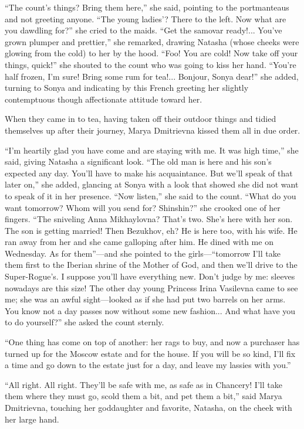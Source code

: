 ``The count's things? Bring them here,'' she said, pointing to
the portmanteaus and not greeting anyone. ``The young ladies'?
There to the left. Now what are you dawdling for?'' she cried to
the maids. ``Get the samovar ready!... You've grown plumper and
prettier,'' she remarked, drawing Natasha (whose cheeks were
glowing from the cold) to her by the hood. ``Foo! You are cold!
Now take off your things, quick!'' she shouted to the count who
was going to kiss her hand. ``You're half frozen, I'm sure! Bring
some rum for tea!... Bonjour, Sonya dear!'' she added, turning to
Sonya and indicating by this French greeting her slightly
contemptuous though affectionate attitude toward her.

When they came in to tea, having taken off their outdoor things
and tidied themselves up after their journey, Marya Dmitrievna
kissed them all in due order.

``I'm heartily glad you have come and are staying with me. It was
high time,'' she said, giving Natasha a significant look. ``The
old man is here and his son's expected any day. You'll have to
make his acquaintance.  But we'll speak of that later on,'' she
added, glancing at Sonya with a look that showed she did not want
to speak of it in her presence. ``Now listen,'' she said to the
count. ``What do you want tomorrow? Whom will you send for?
Shinshin?'' she crooked one of her fingers. ``The sniveling Anna
Mikhaylovna? That's two. She's here with her son. The son is
getting married! Then Bezukhov, eh? He is here too, with his
wife. He ran away from her and she came galloping after him. He
dined with me on Wednesday. As for them''---and she pointed to
the girls---``tomorrow I'll take them first to the Iberian shrine
of the Mother of God, and then we'll drive to the
Super-Rogue's. I suppose you'll have everything new.  Don't judge
by me: sleeves nowadays are this size! The other day young
Princess Irina Vasilevna came to see me; she was an awful
sight---looked as if she had put two barrels on her arms. You
know not a day passes now without some new fashion... And what
have you to do yourself?'' she asked the count sternly.

``One thing has come on top of another: her rags to buy, and now
a purchaser has turned up for the Moscow estate and for the
house. If you will be so kind, I'll fix a time and go down to the
estate just for a day, and leave my lassies with you.''

``All right. All right. They'll be safe with me, as safe as in
Chancery!  I'll take them where they must go, scold them a bit,
and pet them a bit,'' said Marya Dmitrievna, touching her
goddaughter and favorite, Natasha, on the cheek with her large
hand.

